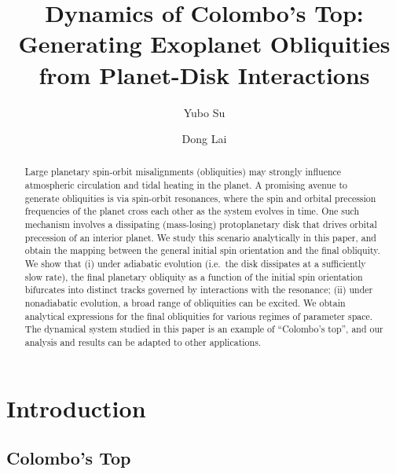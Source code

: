 \documentclass[twocolumn,twocolappendix]{aastex63}
\begin{document}
\title{Dynamics of Colombo's Top: Generating Exoplanet Obliquities from
Planet-Disk Interactions}



\author[0000-0001-8283-3425]{Yubo Su}%

\author[0000-0002-1934-6250]{Dong Lai}%

\begin{abstract}

Large planetary spin-orbit misalignments (obliquities) may strongly influence
atmospheric circulation and tidal heating in the planet. A promising avenue to
generate obliquities is via spin-orbit resonances, where the spin and orbital
precession frequencies of the planet cross each other as the system evolves in
time. One such mechanism involves a dissipating (mass-losing) protoplanetary
disk that drives orbital precession of an interior planet. We study this
scenario analytically in this paper, and obtain the mapping between the general
initial spin orientation and the final obliquity. We show that (i) under
adiabatic evolution (i.e.\ the disk dissipates at a sufficiently slow rate), the
final planetary obliquity as a function of the initial spin orientation
bifurcates into distinct tracks governed by interactions with the resonance;
(ii) under nonadiabatic evolution, a broad range of obliquities can be excited.
We obtain analytical expressions for the final obliquities for various
regimes of parameter space. The dynamical system studied in this paper is an
example of ``Colombo's top'', and our analysis and results can be adapted to
other applications.

\end{abstract}


\section{Introduction}\label{s:intro}

\subsection{Colombo's Top}
\end{document}
